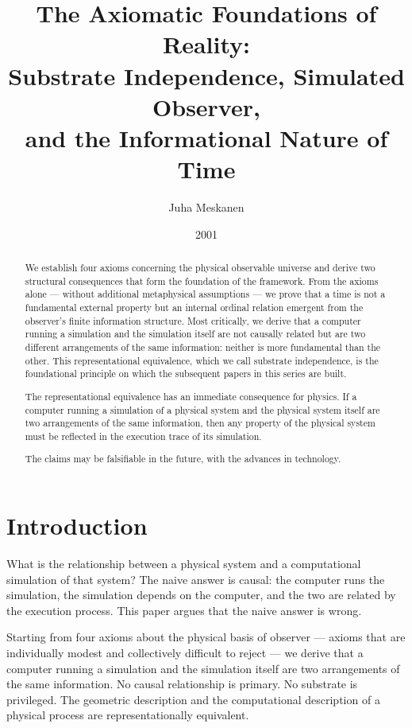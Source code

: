 \documentclass[11pt]{article}
\title{The Axiomatic Foundations of Reality:\\
Substrate Independence, Simulated Observer,\\
and the Informational Nature of Time}
\author{Juha Meskanen}
\date{2001}
\begin{document}
\maketitle

\begin{abstract}
We establish four axioms concerning the physical observable universe
and derive two structural consequences that form the foundation of the
framework. From the axioms alone --- without additional metaphysical
assumptions --- we prove that a time is not a fundamental external property
but an internal ordinal relation emergent from the observer's finite information
structure. Most critically, we derive that a computer running a simulation and
the simulation itself are not causally related but are two different
arrangements of the same information: neither is more fundamental than the
other. This representational equivalence, which we call substrate independence,
is the foundational principle on which the subsequent papers in this series
are built.

The representational equivalence has an immediate consequence for physics. If
a computer running a simulation of a physical system and the physical system
itself are two arrangements of the same information, then any property of the
physical system must be reflected in the execution trace of its simulation.

The claims may be falsifiable in the future, with the advances in technology.
\end{abstract}

\section{Introduction}
\label{sec:intro}

What is the relationship between a physical system and a computational
simulation of that system? The naive answer is causal: the computer runs the
simulation, the simulation depends on the computer, and the two are related
by the execution process. This paper argues that the naive answer is wrong.

Starting from four axioms about the physical basis of observer --- axioms
that are individually modest and collectively difficult to reject --- we derive
that a computer running a simulation and the simulation itself are two
arrangements of the same information. No causal relationship is primary. No
substrate is privileged. The geometric description and the computational
description of a physical process are representationally equivalent.
\end{document}
